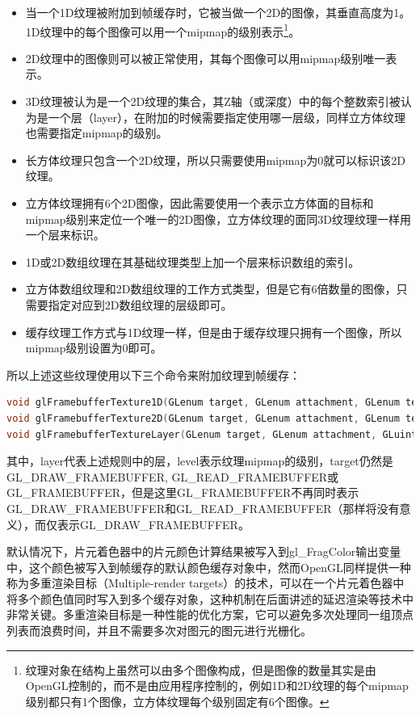 \begin{itemize}
	\item 当一个1D纹理被附加到帧缓存时，它被当做一个2D的图像，其垂直高度为1。1D纹理中的每个图像可以用一个mipmap的级别表示\footnote{纹理对象在结构上虽然可以由多个图像构成，但是图像的数量其实是由OpenGL控制的，而不是由应用程序控制的，例如1D和2D纹理的每个mipmap级别都只有1个图像，立方体纹理每个级别固定有6个图像。}。
	\item 2D纹理中的图像则可以被正常使用，其每个图像可以用mipmap级别唯一表示。
	\item 3D纹理被认为是一个2D纹理的集合，其Z轴（或深度）中的每个整数索引被认为是一个层（layer），在附加的时候需要指定使用哪一层级，同样立方体纹理也需要指定mipmap的级别。
	\item 长方体纹理只包含一个2D纹理，所以只需要使用mipmap为0就可以标识该2D纹理。
	\item 立方体纹理拥有6个2D图像，因此需要使用一个表示立方体面的目标和mipmap级别来定位一个唯一的2D图像，立方体纹理的面同3D纹理纹理一样用一个层来标识。
	\item 1D或2D数组纹理在其基础纹理类型上加一个层来标识数组的索引。
	\item 立方体数组纹理和2D数组纹理的工作方式类型，但是它有6倍数量的图像，只需要指定对应到2D数组纹理的层级即可。
	\item 缓存纹理工作方式与1D纹理一样，但是由于缓存纹理只拥有一个图像，所以mipmap级别设置为0即可。​
\end{itemize}

所以上述这些纹理使用以下三个命令来附加纹理到帧缓存：

\begin{lstlisting}[language=C++]
void glFramebufferTexture1D​(GLenum target​, GLenum attachment​, GLenum textarget​, GLuint texture​, GLint level​);
void glFramebufferTexture2D​(GLenum target​, GLenum attachment​, GLenum textarget​, GLuint texture​, GLint level​);
void glFramebufferTextureLayer​(GLenum target​, GLenum attachment​, GLuint texture​, GLint level​, GLint layer​);
\end{lstlisting}

其中，layer代表上述规则中的层，level表示纹理mipmap的级别，target仍然是GL\_DRAW\_FRAMEBUFFER, GL\_READ\_FRAMEBUFFER或 GL\_FRAMEBUFFER，但是这里GL\_FRAMEBUFFER不再同时表示GL\_DRAW\_FRAMEBUFFER和GL\_READ\_FRAMEBUFFER（那样将没有意义），而仅表示GL\_DRAW\_FRAMEBUFFER。 

默认情况下，片元着色器中的片元颜色计算结果被写入到gl\_FragColor输出变量中，这个颜色被写入到帧缓存的默认颜色缓存对象中，然而OpenGL同样提供一种称为多重渲染目标（Multiple-render targets）的技术，可以在一个片元着色器中将多个颜色值同时写入到多个缓存对象，这种机制在后面讲述的延迟渲染等技术中非常关键。多重渲染目标是一种性能的优化方案，它可以避免多次处理同一组顶点列表而浪费时间，并且不需要多次对图元的图元进行光栅化。

